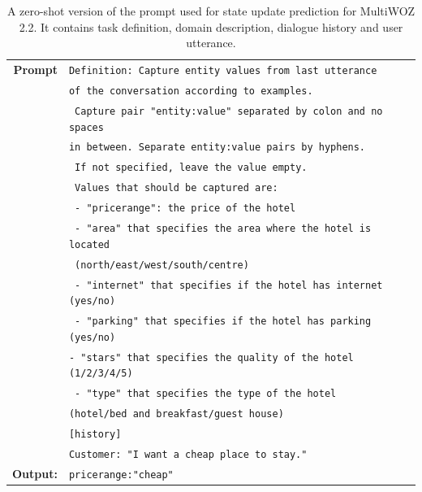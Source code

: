 \begin{table}[H]
    \centering\small
    \begin{tabular}{rl}
      \toprule
      \textbf{Prompt} & \texttt{{\color{cyan!80!yellow!80!black!100 }Definition: Capture entity values from last utterance}}\\
      & \texttt{{\color{cyan!80!yellow!80!black!100 }of the conversation according to examples.}} \\
    & \texttt{{\color{cyan!80!yellow!80!black!100 } Capture pair "entity:value" separated by colon and no spaces}}\\ 
    & \texttt{{\color{cyan!80!yellow!80!black!100 }in between. Separate entity:value pairs by hyphens.}} \\
      & \texttt{{\color{cyan!80!yellow!80!black!100!} If not specified, leave the value empty.}}\\ 
      & \texttt{{\color{cyan!80!yellow!80!black!100!} Values that should be captured are: }} \\
      & \texttt{{\color{green!100!yellow!70!black!100!} - "pricerange": the price of the hotel} }\\
      & \texttt{{\color{green!100!yellow!70!black!100!} - "area" that specifies the area where the hotel is located}} \\
      & \texttt{{\color{green!100!yellow!70!black!100!}
      (north/east/west/south/centre)}} \\
      & \texttt{{\color{green!100!yellow!70!black!100!} - "internet" that specifies if the hotel has internet (yes/no)}} \\
      & \texttt{{\color{green!100!yellow!70!black!100!} - "parking" that specifies if the hotel has parking (yes/no)}} \\
      & \texttt{{\color{green!100!yellow!70!black!100!}- "stars" that specifies the quality of the hotel (1/2/3/4/5)}} \\
      & \texttt{{\color{green!100!yellow!70!black!100!} - "type" that specifies the type of the hotel}}\\
      & \texttt{{\color{green!100!yellow!70!black!100!}(hotel/bed and breakfast/guest house)}} \\
      & \texttt{{\color{red!100!yellow!70!black!100!}[history] }} \\
      &  \texttt{{\color{orange!50!yellow!90!black!100!}Customer: "I want a cheap place to stay." }}\\
      \midrule
      \textbf{Output:} & \texttt{pricerange:"cheap"}\\
      \bottomrule
  \end{tabular}
  \caption{A zero-shot version of the prompt used for state update prediction for MultiWOZ 2.2.
  It contains {\color{cyan!80!yellow!80!black!100} task definition},  {\color{green!100!yellow!70!black!100!}domain description}, {\color{red!100!yellow!70!black!100!} dialogue history} and {\color{orange!50!yellow!90!black!100!} user utterance}. }
  \label{07_tab:zero-shot-state}
\end{table}

